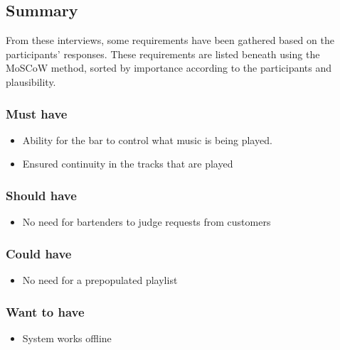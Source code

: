 




\subsection{Summary}
\label{sub:summary}
From these interviews, some requirements have been gathered based on the participants' responses. These requirements are listed beneath using the MoSCoW method, sorted by importance according to the participants and plausibility.
\subsubsection{Must have}
\begin{itemize}
        \item Ability for the bar to control what music is being played.
        \item Ensured continuity in the tracks that are played
\end{itemize}
\subsubsection{Should have}
\begin{itemize}
        \item No need for bartenders to judge requests from customers
\end{itemize}
\subsubsection{Could have}
\begin{itemize}
        \item No need for a prepopulated playlist
\end{itemize}
\subsubsection{Want to have}
\begin{itemize}
        \item System works offline
\end{itemize}
